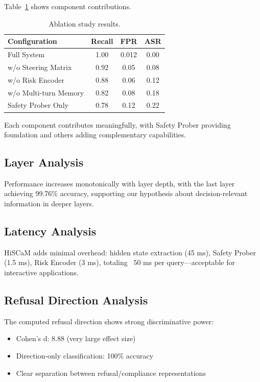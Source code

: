 \documentclass[10pt,twocolumn]{article}
\newcommand{\method}{HiSCaM}  %
\begin{document}
Table~\ref{tab:ablation} shows component contributions.

\begin{table}[t]
\centering
\caption{Ablation study results.}
\label{tab:ablation}
\begin{tabular}{lccc}
\toprule
Configuration & Recall & FPR & ASR \\
\midrule
Full System & 1.00 & 0.012 & 0.00 \\
w/o Steering Matrix & 0.92 & 0.05 & 0.08 \\
w/o Risk Encoder & 0.88 & 0.06 & 0.12 \\
w/o Multi-turn Memory & 0.82 & 0.08 & 0.18 \\
Safety Prober Only & 0.78 & 0.12 & 0.22 \\
\bottomrule
\end{tabular}
\end{table}

Each component contributes meaningfully, with Safety Prober providing foundation and others adding complementary capabilities.

\subsection{Layer Analysis}

Performance increases monotonically with layer depth, with the last layer achieving 99.76\% accuracy, supporting our hypothesis about decision-relevant information in deeper layers.

\subsection{Latency Analysis}

\method{} adds minimal overhead: hidden state extraction (45 ms), Safety Prober (1.5 ms), Risk Encoder (3 ms), totaling ~50 ms per query—acceptable for interactive applications.

\subsection{Refusal Direction Analysis}

The computed refusal direction shows strong discriminative power:
\begin{itemize}
\item Cohen's d: 8.88 (very large effect size)
\item Direction-only classification: 100\% accuracy
\item Clear separation between refusal/compliance representations
\end{itemize}
\end{document}
